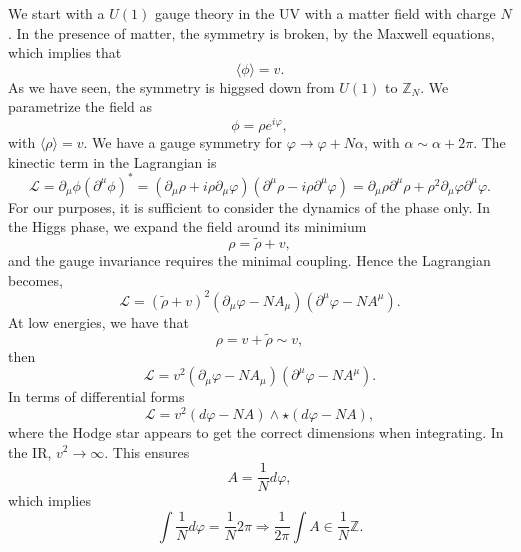 \documentclass{article}
\begin{document}
We start with a $U(1)$ gauge theory in the UV with a matter field with charge $N$. In the presence of matter, the symmetry is broken, by the Maxwell equations, which implies that 
\begin{equation*}
	\langle \phi\rangle=v. 
\end{equation*} 
As we have seen, the symmetry is higgsed down from $U(1)$ to $\mathbb{Z}_N$. We parametrize the field as 
\begin{equation}
	\phi = \rho e^{i\varphi}, 
\end{equation}
with $\langle\rho\rangle=v$. We have a gauge symmetry for $\varphi\to\varphi+N\alpha$, with $\alpha\sim\alpha+2\pi.$ The kinectic term in the Lagrangian is 
\begin{equation}
	\mathcal{L}=\partial_\mu\phi(\partial^\mu\phi)^*=(\partial_\mu\rho+i\rho\partial_\mu\varphi)(\partial^\mu\rho-i\rho\partial^\mu\varphi)=\partial_\mu\rho\partial^\mu\rho+\rho^2\partial_\mu\varphi\partial^\mu\varphi.
\end{equation} 
For our purposes, it is sufficient to consider the dynamics of the phase only. In the Higgs phase, we expand the field around its minimium
\begin{equation}
	\rho=\tilde{\rho}+v,
\end{equation}
and the gauge invariance requires the minimal coupling. Hence the Lagrangian becomes, 
\begin{equation}
	\mathcal{L}=(\tilde{\rho}+v)^2(\partial_\mu\varphi-NA_\mu)(\partial^\mu\varphi-NA^\mu).
\end{equation}
At low energies, we have that 
\begin{equation}
	\rho = v+\tilde{\rho}\sim v, 
\end{equation}
then 
\begin{equation}
	\mathcal{L}=v^2(\partial_\mu\varphi-NA_\mu)(\partial^\mu\varphi-NA^\mu).
\end{equation}
In terms of differential forms 
\begin{equation}\label{not bf lagrangian}
	\mathcal{L}=v^2(d\varphi-NA)\wedge\star(d\varphi-NA),
\end{equation}
where the Hodge star appears to get the correct dimensions when integrating. In the IR, $v^2\to\infty$. This ensures 
\begin{equation}
	A=\frac{1}{N}d\varphi,
\end{equation}
which implies 
\begin{equation}
	\int\frac{1}{N}d\varphi=\frac{1}{N}2\pi\Rightarrow\frac{1}{2\pi}\int A\in\frac{1}{N}\mathbb{Z}.
\end{equation}
\end{document}
